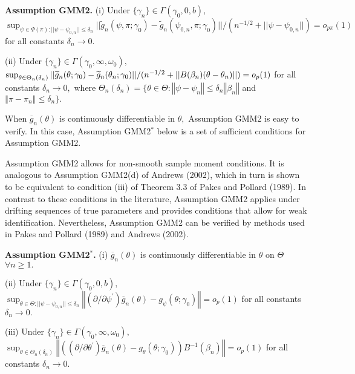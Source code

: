\documentclass[12pt,thmsb,titlepage,final,oneside,letterpaper]{article}
\begin{document}
\noindent \textbf{Assumption GMM2. }(i) Under $\{\gamma _{n}\}\in \Gamma
(\gamma _{0},0,b),$ \newline
$\sup_{\psi \in \Psi (\pi ):||\psi -\psi _{0,n}||\leq \delta _{n}}||%
\widetilde{g}_{n}(\psi ,\pi ;\gamma _{0})-\widetilde{g}_{n}(\psi _{0,n},\pi
;\gamma _{0})||/(n^{-1/2}+||\psi -\psi _{0,n}||)=o_{p\pi }(1)$ for all
constants $\delta _{n}\rightarrow 0.$

\noindent (ii) Under $\{\gamma _{n}\}\in \Gamma (\gamma _{0},\infty ,\omega
_{0}),$ $\sup_{\theta \in \Theta _{n}\left( \delta _{n}\right) }||\widetilde{%
g}_{n}(\theta ;\gamma _{0})-\widetilde{g}_{n}(\theta _{n};\gamma
_{0})||/(n^{-1/2}+||B(\beta _{n})(\theta -\theta _{n})||)=o_{p}(1)$ for all
constants $\delta _{n}\rightarrow 0,$ where $\Theta _{n}\left( \delta
_{n}\right) =\{\theta \in \Theta :\left\Vert \psi -\psi _{n}\right\Vert \leq
\delta _{n}\left\Vert \beta _{n}\right\Vert $ and $\left\Vert \pi -\pi
_{n}\right\Vert \leq \delta _{n}\}.$\medskip

When $\overline{g}_{n}\left( \theta \right) $ is continuously differentiable
in $\theta ,$ Assumption GMM2 is easy to verify. In this case, Assumption
GMM2$^{\ast }$ below is a set of sufficient conditions for Assumption GMM2.

Assumption GMM2 allows for non-smooth sample moment conditions. It is
analogous to Assumption GMM2(d) of Andrews (2002), which in turn is shown to
be equivalent to condition (iii) of Theorem 3.3 of Pakes and Pollard (1989).
In contrast to these conditions in the literature, Assumption GMM2 applies
under drifting sequences of true parameters and provides conditions that
allow for weak identification. Nevertheless, Assumption GMM2 can be verified
by methods used in Pakes and Pollard (1989) and Andrews (2002).\medskip

\noindent \textbf{Assumption GMM2}$^{\ast }$\textbf{.} (i) $\overline{g}%
_{n}(\theta )$ is continuously differentiable in $\theta $ on $\Theta $ $%
\forall n\geq 1.$

\noindent (ii) Under $\{\gamma _{n}\}\in \Gamma (\gamma _{0},0,b),$ $%
\sup_{\theta \in \Theta :||\psi -\psi _{0,n}||\leq \delta _{n}}\left\Vert
(\partial /\partial \psi ^{\prime })\overline{g}_{n}(\theta )-g_{\psi
}(\theta ;\gamma _{0})\right\Vert =o_{p}(1)$ for all constants $\delta
_{n}\rightarrow 0.$

\noindent (iii) Under $\{\gamma _{n}\}\in \Gamma (\gamma _{0},\infty ,\omega
_{0}),$ $\sup_{\theta \in \Theta _{n}\left( \delta _{n}\right) }\left\Vert
\left( (\partial /\partial \theta ^{\prime })\overline{g}_{n}(\theta
)-g_{\theta }(\theta ;\gamma _{0})\right) B^{-1}(\beta _{n})\right\Vert
=o_{p}(1)$ for all constants $\delta _{n}\rightarrow 0.$\medskip
\end{document}
